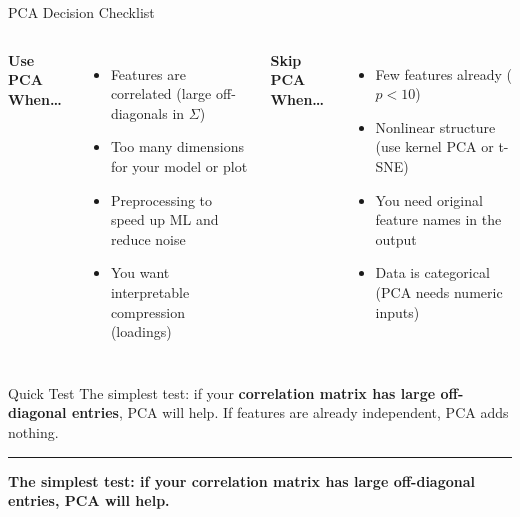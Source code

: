 \documentclass[8pt,aspectratio=169]{beamer}
\newcommand{\bottomnote}[1]{%
\vfill
\vspace{-2mm}
\textcolor{mllavender2}{\rule{\textwidth}{0.4pt}}
\vspace{1mm}
\footnotesize
\textbf{#1}
}
\newenvironment{compactlist}{%
  \begin{itemize}%
    \setlength{\itemsep}{2pt}%
    \setlength{\parskip}{0pt}%
    \setlength{\parsep}{0pt}%
}{%
  \end{itemize}%
}
\newcommand{\highlight}[1]{\textcolor{mlorange}{\textbf{#1}}}
\begin{document}
\begin{frame}[t]{PCA Decision Checklist}
\begin{columns}[T]
\small
\textbf{\textcolor{mlgreen}{Use PCA When\ldots}}
\begin{compactlist}
\item Features are correlated (large off-diagonals in $\Sigma$)
\item Too many dimensions for your model or plot
\item Preprocessing to speed up ML and reduce noise
\item You want interpretable compression (loadings)
\end{compactlist}

\small
\textbf{\textcolor{mlred}{Skip PCA When\ldots}}
\begin{compactlist}
\item Few features already ($p < 10$)
\item Nonlinear structure (use kernel PCA or t-SNE)
\item You need original feature names in the output
\item Data is categorical (PCA needs numeric inputs)
\end{compactlist}
\end{columns}

\vspace{4mm}
\begin{block}{Quick Test}
\small The simplest test: if your \highlight{correlation matrix has large off-diagonal entries}, PCA will help. If features are already independent, PCA adds nothing.
\end{block}

\bottomnote{The simplest test: if your correlation matrix has large off-diagonal entries, PCA will help.}
\end{frame}
\end{document}
